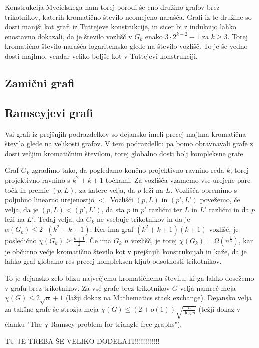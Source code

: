 \documentclass[mat1, tisk]{fmfdelo}
\begin{document}
Konstrukcija Mycielskega nam torej porodi še eno družino grafov brez trikotnikov, katerih kromatično število neomejeno narašča. Grafi iz te družine so dosti manjši kot grafi iz Tuttejeve konstrukcije,
in sicer bi z indukcijo lahko enostavno dokazali, da je število vozlišč v $G_k$ enako $3 \cdot 2^{k-2} - 1$ za $k \geq 3$. Torej kromatično število narašča logaritemsko glede na število vozlišč. To je še vedno dosti
majhno, vendar veliko boljše kot v Tuttejevi konstrukciji.

\subsection{Zamični grafi}

\subsection{Ramseyjevi grafi}
Vsi grafi iz prejšnjih podrazdelkov so dejansko imeli precej majhna kromatična števila glede na velikosti grafov. V tem podrazdelku pa bomo obravnavali grafe z dosti večjim kromatičnim številom,
torej globalno dosti bolj kompleksne grafe.

Graf $G_k$ zgradimo tako, da pogledamo končno projektivno ravnino reda $k$, torej projektivno ravnino s $k^2 + k + 1$ točkami. Za vozlišča vzamemo vse urejene pare točk in premic $(p, L)$, za katere velja,
da $p$ leži na $L$. Vozlišča opremimo s poljubno linearno urejenostjo $<$. Vozlišči $(p, L)$ in $(p', L')$ povežemo, če velja, da je $(p, L) < (p', L')$, da sta $p$ in $p'$ različni ter $L$ in $L'$
različni in da $p$ leži na $L'$. Tedaj velja, da $G_k$ ne vsebuje trikotnikov in da je $\alpha(G_k) \leq 2 \cdot (k^2 + k + 1)$. Ker ima graf $(k^2 + k + 1)(k + 1)$ vozlišč, je posledično $\chi(G_k) \geq \frac{k + 1}{2}$.
Če ima $G_k$ $n$ vozlišč, je torej $\chi(G_k) = \Omega(n^{\frac{1}{3}})$, kar je občutno večje kromatično število kot v prejšnjih konstrukcijah in kaže, da je lahko graf globalno res precej kompleksen
kljub odsotnosti trikotnikov.

To je dejansko zelo blizu največjemu kromatičnemu številu, ki ga lahko dosežemo v grafu brez trikotnikov. Za vse grafe brez trikotnikov $G$ velja namreč meja $\chi(G) \leq 2\sqrt{n} + 1$ (lažji dokaz na
Mathematics stack exchange). Dejansko velja za takšne grafe še strožja meja $\chi(G) \leq (2 + o(1))\sqrt{\frac{n}{\log{n}}}$ (težji dokaz v članku "The $\chi$-Ramsey problem for triangle-free graphs").

TU JE TREBA ŠE VELIKO DODELATI!!!!!!!!!!!!!
\end{document}
